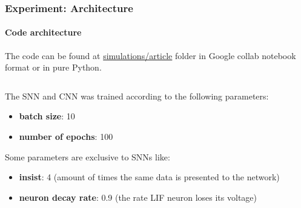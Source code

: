 \begin{frame}
	\frametitle{Experiment: Architecture}
	\framesubtitle{Code architecture}
	\par The code can be found at \href{https://github.com/ensismoebius/deepLearnning/tree/main/simulations/article}{simulations/article} folder in Google collab notebook format or in pure Python.
	\begin{columns}
		\begin{column}{0.5\textwidth}
			\par The SNN and CNN was trained according to the following parameters:
			\begin{itemize}
				\item \textbf{batch size}: 10
				\item \textbf{number of epochs}: 100
			\end{itemize}
			
			\par Some parameters are exclusive to SNNs like:
			
			\begin{itemize}
				\item \textbf{insist}: 4 (amount of times the same data is presented to the network)
				\item \textbf{neuron decay rate}: 0.9 (the rate LIF neuron loses its voltage)
			\end{itemize}	
		\end{column}
		\begin{column}{0.5\textwidth}
			\only<1>{
				
			}
			\only<2>{
				
			}
		\end{column}
	\end{columns}
\end{frame}

